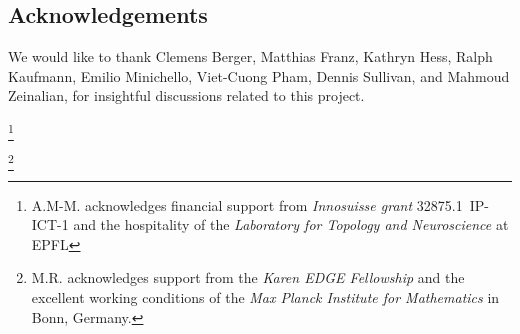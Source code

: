 
\subsection*{Acknowledgements}

We would like to thank Clemens Berger, Matthias Franz, Kathryn Hess, Ralph Kaufmann, Emilio Minichello, Viet-Cuong Pham, Dennis Sullivan, and Mahmoud Zeinalian, for insightful discussions related to this project.

\thanks{A.M-M. acknowledges financial support from \textit{Innosuisse grant} \mbox{32875.1 IP-ICT-1} and the hospitality of the \textit{Laboratory for Topology and Neuroscience} at EPFL}

\thanks{M.R. acknowledges support from the \textit{Karen EDGE Fellowship} and the excellent working conditions of the \textit{Max Planck Institute for Mathematics} in Bonn, Germany.}